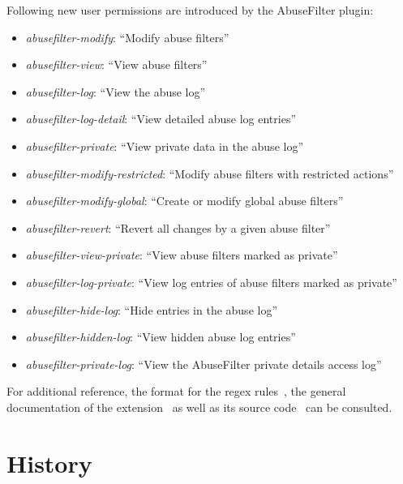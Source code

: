 Following new user permissions are introduced by the AbuseFilter plugin: %
\begin{itemize}
    \item \emph{abusefilter-modify}: ``Modify abuse filters''
    \item \emph{abusefilter-view}: ``View abuse filters''
    \item \emph{abusefilter-log}: ``View the abuse log''
    \item \emph{abusefilter-log-detail}: ``View detailed abuse log entries''
    \item \emph{abusefilter-private}: ``View private data in the abuse log''
    \item \emph{abusefilter-modify-restricted}: ``Modify abuse filters with restricted actions''
    \item \emph{abusefilter-modify-global}: ``Create or modify global abuse filters''
    \item \emph{abusefilter-revert}: ``Revert all changes by a given abuse filter''
    \item \emph{abusefilter-view-private}: ``View abuse filters marked as private''
    \item \emph{abusefilter-log-private}: ``View log entries of abuse filters marked as private''
    \item \emph{abusefilter-hide-log}: ``Hide entries in the abuse log''
    \item \emph{abusefilter-hidden-log}: ``View hidden abuse log entries''
    \item \emph{abusefilter-private-log}: ``View the AbuseFilter private details access log''
\end{itemize}

For additional reference, the format for the regex rules~\cite{Mediawiki:AbuseFilterRules}, the general documentation of the extension~\cite{Mediawiki:AbuseFilterExtension} as well as its source code~\cite{gerrit-abusefilter-source} can be consulted.



\section{History}
\label{section:4-history}

